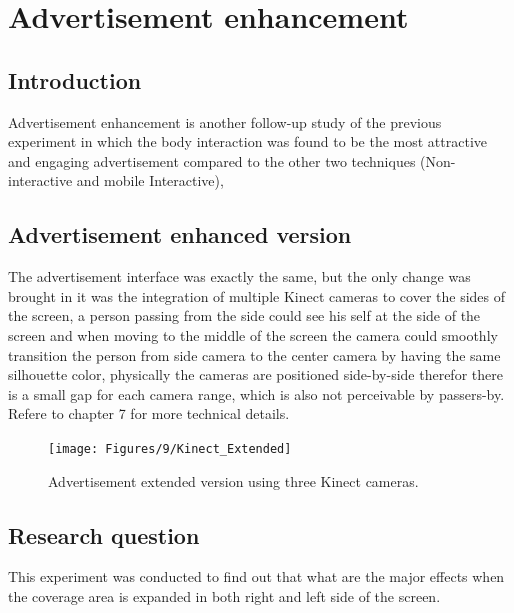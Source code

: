 \chapter{Advertisement enhancement} %

\label{Chapter9} %

\section{Introduction}




Advertisement enhancement is another follow-up study of the previous experiment in which the body interaction was found to be the most attractive and engaging advertisement compared to the other two techniques (Non-interactive and mobile Interactive), 






\section{Advertisement enhanced version}

The advertisement interface was exactly the same, but the only change was brought in it was the integration of multiple Kinect cameras to cover the sides of the screen, a person passing from the side could see his self at the side of the screen and when moving to the middle of the screen the camera could smoothly transition the person from side camera to the center camera by having the same silhouette color, physically the cameras are positioned side-by-side therefor there is a small gap for each camera range, which is also not perceivable by passers-by. Refere to chapter 7 for more technical details.


\begin{figure}[H]
    \centering
    \texttt{[image: Figures/9/Kinect\_Extended]}
    \caption{Advertisement extended version using three Kinect cameras.}%
    \label{fig:KinectExtended}%
\end{figure}




\section{Research question}
This experiment was conducted to find out that what are the major effects when the coverage area is expanded in both right and left side of the screen.

